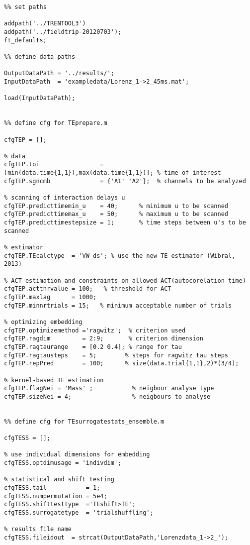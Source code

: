 \begin{lstlisting}
%% set paths

addpath('../TRENTOOL3')
addpath('../fieldtrip-20120703');
ft_defaults;

%% define data paths

OutputDataPath = '../results/';
InputDataPath  = 'exampledata/Lorenz_1->2_45ms.mat';

load(InputDataPath);


%% define cfg for TEprepare.m

cfgTEP = [];

% data
cfgTEP.toi                 = [min(data.time{1,1}),max(data.time{1,1})]; % time of interest
cfgTEP.sgncmb              = {'A1' 'A2'};  % channels to be analyzed

% scanning of interaction delays u
cfgTEP.predicttimemin_u    = 40;      % minimum u to be scanned
cfgTEP.predicttimemax_u    = 50;	  % maximum u to be scanned
cfgTEP.predicttimestepsize = 1; 	  % time steps between u's to be scanned

% estimator
cfgTEP.TEcalctype  = 'VW_ds'; % use the new TE estimator (Wibral, 2013)

% ACT estimation and constraints on allowed ACT(autocorelation time)
cfgTEP.actthrvalue = 100;   % threshold for ACT
cfgTEP.maxlag      = 1000;
cfgTEP.minnrtrials = 15;   % minimum acceptable number of trials

% optimizing embedding
cfgTEP.optimizemethod ='ragwitz';  % criterion used
cfgTEP.ragdim         = 2:9;       % criterion dimension
cfgTEP.ragtaurange    = [0.2 0.4]; % range for tau
cfgTEP.ragtausteps    = 5;        % steps for ragwitz tau steps
cfgTEP.repPred        = 100;      % size(data.trial{1,1},2)*(3/4);

% kernel-based TE estimation
cfgTEP.flagNei = 'Mass' ;           % neigbour analyse type
cfgTEP.sizeNei = 4;                 % neigbours to analyse


%% define cfg for TEsurrogatestats_ensemble.m

cfgTESS = [];

% use individual dimensions for embedding
cfgTESS.optdimusage = 'indivdim';

% statistical and shift testing
cfgTESS.tail           = 1;
cfgTESS.numpermutation = 5e4;
cfgTESS.shifttesttype  ='TEshift>TE';
cfgTESS.surrogatetype  = 'trialshuffling';

% results file name
cfgTESS.fileidout  = strcat(OutputDataPath,'Lorenzdata_1->2_');


\end{lstlisting}
